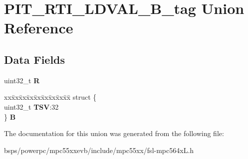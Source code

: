 \hypertarget{unionPIT__RTI__LDVAL__32B__tag}{}\section{P\+I\+T\+\_\+\+R\+T\+I\+\_\+\+L\+D\+V\+A\+L\+\_\+B\+\_\+tag Union Reference}
\label{unionPIT__RTI__LDVAL__32B__tag}
\subsection*{Data Fields}
\begin{DoxyCompactItemize}
\item 
\mbox{\label{unionPIT__RTI__LDVAL__32B__tag_a9538d92e73ceba4c03e6659440ebf23f}} 
uint32\+\_\+t {\bfseries R}
\item 
\mbox{\label{unionPIT__RTI__LDVAL__32B__tag_a6dd6f68b0ce2181e1e85ac250731096a}} 
\begin{tabbing}
xx\=xx\=xx\=xx\=xx\=xx\=xx\=xx\=xx\=\kill
struct \{\\
\>uint32\_t {\bfseries TSV}:32\\
\} {\bfseries B}\\

\end{tabbing}\end{DoxyCompactItemize}


The documentation for this union was generated from the following file\+:\begin{DoxyCompactItemize}
\item 
bsps/powerpc/mpc55xxevb/include/mpc55xx/fsl-\/mpc564x\+L.\+h\end{DoxyCompactItemize}
